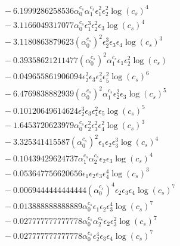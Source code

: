 \documentclass[10pt]{article}
\begin{document}
\begin{align*}
&{}  - 6.1999286258536 \alpha_{0}^{c_s} \alpha_{1}^{c_s} \epsilon_{1}^{2} \epsilon_{2}^{2} \log{\left(c_{s} \right)}^{4} \\
&{}  - 3.1166049317077 \alpha_{0}^{c_s} \epsilon_{1}^{3} \epsilon_{2}^{2} \epsilon_{3} \log{\left(c_{s} \right)}^{4} \\
&{}  - 3.1180863879623 \left(\alpha_{0}^{c_s}\right)^{2} \epsilon_{2}^{3} \epsilon_{3} \epsilon_{4} \log{\left(c_{s} \right)}^{3} \\
&{}  - 0.39358621211477 \left(\alpha_{0}^{c_s}\right)^{2} \alpha_{1}^{c_s} \epsilon_{1} \epsilon_{2}^{2} \log{\left(c_{s} \right)} \\
&{}  - 0.049655861906094 \epsilon_{2}^{2} \epsilon_{3} \epsilon_{4}^{2} \epsilon_{5}^{2} \log{\left(c_{s} \right)}^{6} \\
&{}  - 6.4769838882939 \left(\alpha_{0}^{c_s}\right)^{2} \alpha_{1}^{c_s} \epsilon_{2}^{2} \epsilon_{3} \log{\left(c_{s} \right)}^{5} \\
&{}  - 0.10120649614624 \epsilon_{2}^{3} \epsilon_{3} \epsilon_{4}^{2} \epsilon_{5} \log{\left(c_{s} \right)}^{5} \\
&{}  - 1.6453720623979 \alpha_{0}^{c_s} \epsilon_{2}^{2} \epsilon_{3}^{2} \epsilon_{4}^{2} \log{\left(c_{s} \right)}^{3} \\
&{}  - 3.325341415587 \left(\alpha_{0}^{c_s}\right)^{2} \epsilon_{1} \epsilon_{2} \epsilon_{3}^{3} \log{\left(c_{s} \right)}^{4} \\
&{}  - 0.10439429624737 \alpha_{1}^{c_s} \alpha_{2}^{c_s} \epsilon_{2} \epsilon_{3} \log{\left(c_{s} \right)}^{4} \\
&{}  - 0.053647756620656 \epsilon_{1} \epsilon_{2} \epsilon_{3} \epsilon_{4}^{4} \log{\left(c_{s} \right)}^{3} \\
&{}  - 0.0069444444444444 \left(\alpha_{0}^{c_s}\right)^{4} \epsilon_{2} \epsilon_{3} \epsilon_{4} \log{\left(c_{s} \right)}^{7} \\
&{}  - 0.013888888888889 \alpha_{0}^{c_s} \epsilon_{1} \epsilon_{2} \epsilon_{3}^{4} \log{\left(c_{s} \right)}^{7} \\
&{}  - 0.027777777777778 \alpha_{0}^{c_s} \alpha_{2}^{c_s} \epsilon_{2} \epsilon_{3}^{2} \log{\left(c_{s} \right)}^{7} \\
&{}  - 0.027777777777778 \alpha_{0}^{c_s} \epsilon_{2}^{4} \epsilon_{3} \epsilon_{4} \log{\left(c_{s} \right)}^{7}
\end{align*}
\end{document}
